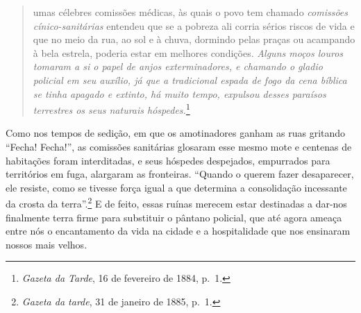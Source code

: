 \begin{quote}
umas célebres comissões médicas, às quais o povo tem chamado
\emph{comissões cínico-sanitárias} entendeu que se a pobreza ali corria
sérios riscos de vida e que no meio da rua, ao sol e à chuva, dormindo
pelas praças ou acampando à bela estrela, poderia estar em melhores
condições. \emph{Alguns moços louros tomaram a si o papel de anjos
exterminadores, e chamando o gladio policial em seu auxílio, já que a
tradicional espada de fogo da cena bíblica se tinha apagado e extinto,
há muito tempo, expulsou desses paraísos terrestres os seus naturais
hóspedes.}\footnote{\emph{Gazeta da Tarde}, 16 de fevereiro de 1884,
  p.~1.}
\end{quote}

Como nos tempos de sedição, em que os amotinadores ganham as ruas
gritando ``Fecha! Fecha!'', as comissões sanitárias glosaram esse mesmo
mote e centenas de habitações foram interditadas, e seus hóspedes
despejados, empurrados para territórios em fuga, alargaram as
fronteiras. ``Quando o querem fazer desaparecer, ele resiste, como se
tivesse força igual a que determina a consolidação incessante da crosta
da terra''.\footnote{\emph{Gazeta da tarde}, 31 de janeiro de 1885,
  p.~1.} E de feito, essas ruínas merecem estar destinadas a dar-nos
finalmente terra firme para substituir o pântano policial, que até agora
ameaça entre nós o encantamento da vida na cidade e a hospitalidade que
nos ensinaram nossos mais velhos.

